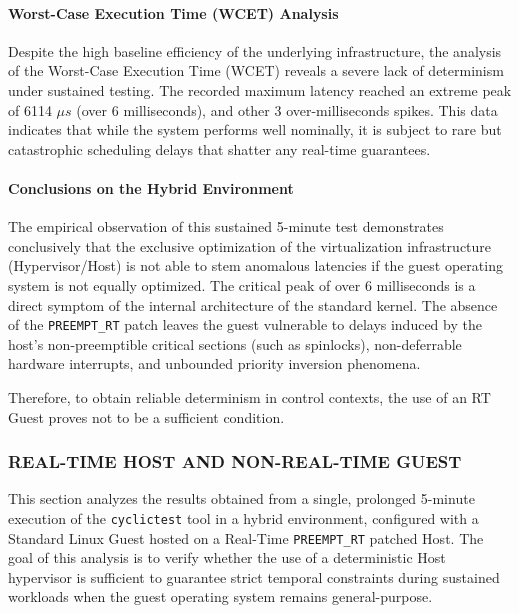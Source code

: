 \paragraph{Worst-Case Execution Time (WCET)
Analysis}\label{worst-case-execution-time-wcet-analysis}

Despite the high baseline efficiency of the underlying infrastructure,
the analysis of the Worst-Case Execution Time (WCET) reveals a severe
lack of determinism under sustained testing. The recorded maximum
latency reached an extreme peak of 6114 $\mu s$ (over 6 milliseconds), and
other 3 over-milliseconds spikes. This data indicates that while the
system performs well nominally, it is subject to rare but catastrophic
scheduling delays that shatter any real-time guarantees.

\paragraph{Conclusions on the Hybrid
Environment}\label{conclusions-on-the-hybrid-environment}

The empirical observation of this sustained 5-minute test demonstrates
conclusively that the exclusive optimization of the virtualization
infrastructure (Hypervisor/Host) is not able to stem anomalous latencies
if the guest operating system is not equally optimized. The critical
peak of over 6 milliseconds is a direct symptom of the internal
architecture of the standard kernel. The absence of the
\texttt{PREEMPT\_RT} patch leaves the guest vulnerable to delays induced
by the host's non-preemptible critical sections (such as spinlocks),
non-deferrable hardware interrupts, and unbounded priority inversion
phenomena.

Therefore, to obtain reliable determinism in control contexts, the use
of an RT Guest proves not to be a sufficient condition.

\subsubsection{REAL-TIME HOST AND NON-REAL-TIME
GUEST}\label{real-time-host-and-non-real-time-guest}

This section analyzes the results obtained from a single, prolonged
5-minute execution of the \texttt{cyclictest} tool in a hybrid
environment, configured with a Standard Linux Guest hosted on a
Real-Time \texttt{PREEMPT\_RT} patched Host. The goal of this analysis
is to verify whether the use of a deterministic Host hypervisor is
sufficient to guarantee strict temporal constraints during sustained
workloads when the guest operating system remains general-purpose.

